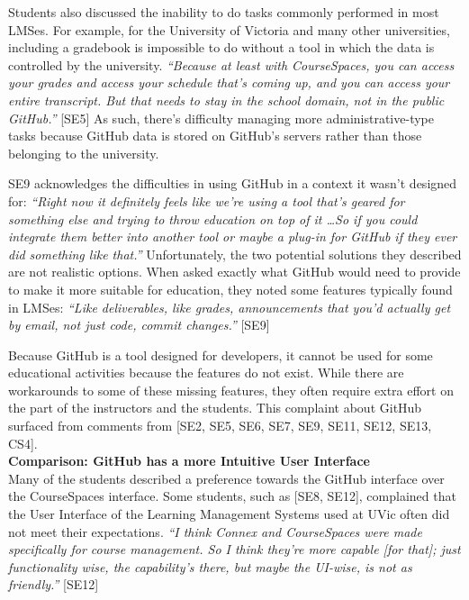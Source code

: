 Students also discussed the inability to do tasks commonly performed in most LMSes. For example, for the University of Victoria and many other universities, including a gradebook is impossible to do without a tool in which the data is controlled by the university. \textit{``Because at least with CourseSpaces, you can access your grades and access your schedule that's coming up, and you can access your entire transcript. But that needs to stay in the school domain, not in the public GitHub.''} [SE5] As such, there's difficulty managing more administrative-type tasks because GitHub data is stored on GitHub's servers rather than those belonging to the university.


SE9 acknowledges the difficulties in using GitHub in a context it wasn't designed for: \textit{``Right now it definitely feels like we're using a tool that's geared for something else and trying to throw education on top of it \ldots So if you could integrate them better into another tool or maybe a plug-in for GitHub if they ever did something like that.''} Unfortunately, the two potential solutions they described are not realistic options. When asked exactly what GitHub would need to provide to make it more suitable for education, they noted some features typically found in LMSes: \textit{``Like deliverables, like grades, announcements that you'd actually get by email, not just code, commit changes.''} [SE9]

Because GitHub is a tool designed for developers, it cannot be used for some educational activities because the features do not exist. While there are workarounds to some of these missing features, they often require extra effort on the part of the instructors and the students. This complaint about GitHub surfaced from comments from [SE2, SE5, SE6, SE7, SE9, SE11, SE12, SE13, CS4]. \\

\textbf{Comparison: GitHub has a more Intuitive User Interface} \\
Many of the students described a preference towards the GitHub interface over the CourseSpaces interface. Some students, such as [SE8, SE12], complained that the User Interface of the Learning Management Systems used at UVic often did not meet their expectations. \textit{``I think Connex and CourseSpaces were made specifically for course management. So I think they're more capable [for that]; just functionality wise, the capability's there, but maybe the UI-wise, is not as friendly.''} [SE12]


